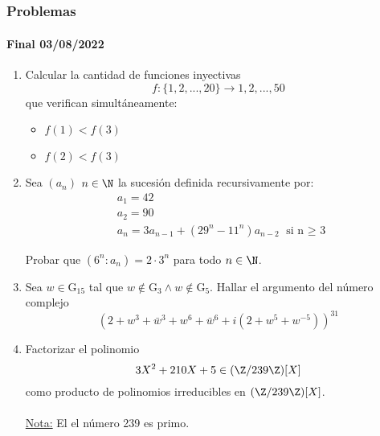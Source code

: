 \documentclass[../main.tex]{subfiles}
\begin{document}
\part[Práctica]{}
\section{Problemas}

\subsection{Final 03/08/2022} {

\begin{enumerate}
    \item { Calcular la cantidad de funciones inyectivas
        \begin{equation*}
            f: \{1,2,...,20\} \rightarrow {1,2,...,50}
        \end{equation*}
        que verifican simultáneamente:
        
        \begin{itemize}
            \item $f(1) < f(3)$
            \item $f(2) < f(3)$
        \end{itemize}
    }
    
    \item { Sea $(a_n)$ $n \in \N$ la sucesión definida recursivamente por:
        \begin{align*}
            & a_1 = 42 \\
            & a_2 = 90 \\
            & a_n = 3a_{n-1} + (29^n - 11^n) a_{n-2} \text{  si n $\geq$ 3}
        \end{align*}
        
        Probar que $(6^n : a_n) = 2 \cdot 3^n$ para todo $n \in \N$.
    }
    
    \item { Sea $w \in \text{G}_{15}$ tal que $w \notin \text{G}_3 \land w \notin \text{G}_5$. Hallar el argumento del número complejo
        \begin{equation*}
            (2 + w^3 + \bar{w}^3 + w^6 + \bar{w}^6 + i (2 + w^5 + w^{-5} ))^{31}
        \end{equation*}
    }
    
    \item { Factorizar el polinomio
        \begin{equation*}
            3X^2 + 210X + 5 \in (\Z / 239 \Z)[X]
        \end{equation*}
    como producto de polinomios irreducibles en $(\Z / 239 \Z)[X]$.
    \\\\ \ul{Nota:} El el número 239 es primo.
    }
    

\end{enumerate}}
\end{document}

